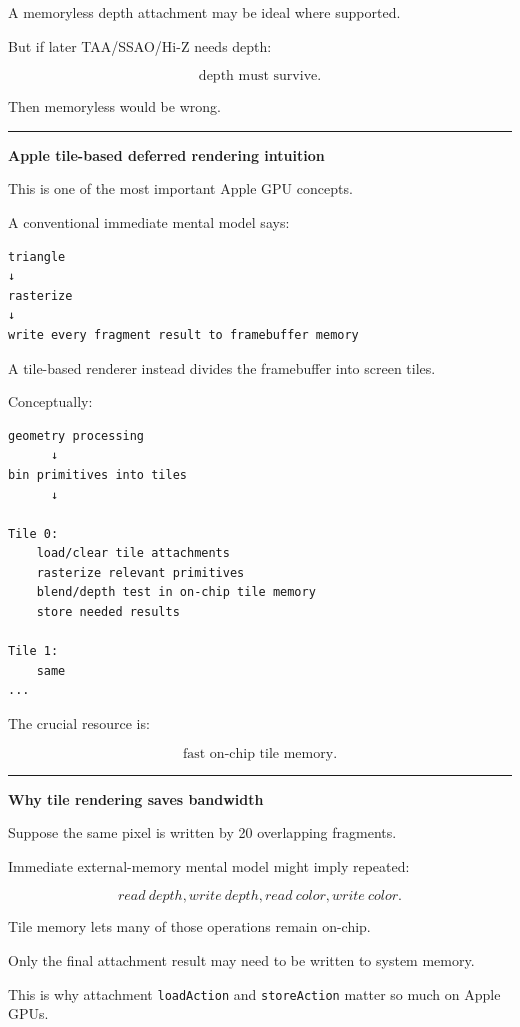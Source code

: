 A memoryless depth attachment may be ideal where supported.

But if later TAA/SSAO/Hi-Z needs depth:

\[
\boxed{
\text{depth must survive}.
}
\]

Then memoryless would be wrong.

\begin{center}\rule{0.5\linewidth}{0.5pt}\end{center}

\textbf{Apple tile-based deferred rendering intuition}

This is one of the most important Apple GPU concepts.

A conventional immediate mental model says:

\begin{verbatim}
triangle
↓
rasterize
↓
write every fragment result to framebuffer memory
\end{verbatim}

A tile-based renderer instead divides the framebuffer into screen tiles.

Conceptually:

\begin{verbatim}
geometry processing
      ↓
bin primitives into tiles
      ↓

Tile 0:
    load/clear tile attachments
    rasterize relevant primitives
    blend/depth test in on-chip tile memory
    store needed results

Tile 1:
    same
...
\end{verbatim}

The crucial resource is:

\[
\boxed{
\text{fast on-chip tile memory}.
}
\]

\begin{center}\rule{0.5\linewidth}{0.5pt}\end{center}

\textbf{Why tile rendering saves bandwidth}

Suppose the same pixel is written by 20 overlapping fragments.

Immediate external-memory mental model might imply repeated:

\[
read\ depth,
write\ depth,
read\ color,
write\ color.
\]

Tile memory lets many of those operations remain on-chip.

Only the final attachment result may need to be written to system memory.

This is why attachment \texttt{loadAction} and \texttt{storeAction} matter so much on Apple GPUs.

